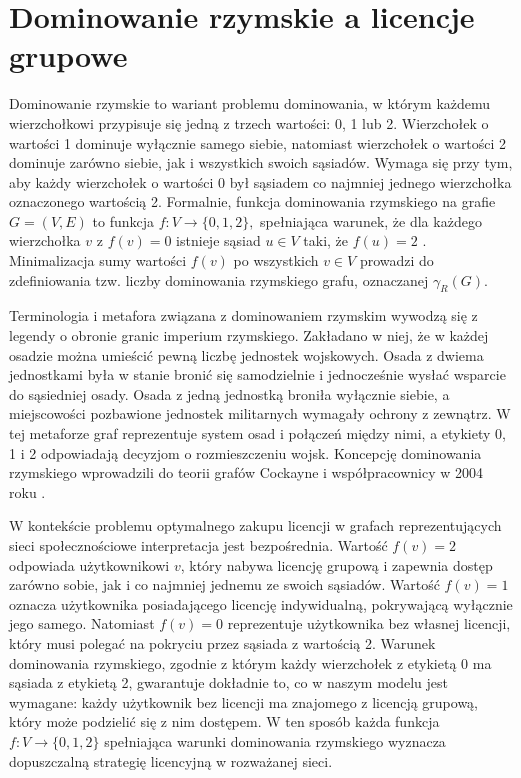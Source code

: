 \section{Dominowanie rzymskie a licencje grupowe}

Dominowanie rzymskie to wariant problemu dominowania, w którym każdemu wierzchołkowi przypisuje się jedną z trzech wartości: 0, 1 lub 2. Wierzchołek o wartości 1 dominuje wyłącznie samego siebie, natomiast wierzchołek o wartości 2 dominuje zarówno siebie, jak i wszystkich swoich sąsiadów. Wymaga się przy tym, aby każdy wierzchołek o wartości 0 był sąsiadem co najmniej jednego wierzchołka oznaczonego wartością 2. Formalnie, funkcja dominowania rzymskiego na grafie $G=(V,E)$ to funkcja $f: V \to \{0,1,2\},$ spełniająca warunek, że dla każdego wierzchołka $v$ z $f(v) = 0$ istnieje sąsiad $u \in V$ taki, że $f(u) = 2$ \cite{Favaron2009}. Minimalizacja sumy wartości $f(v)$ po wszystkich $v \in V$ prowadzi do zdefiniowania tzw. liczby dominowania rzymskiego grafu, oznaczanej $\gamma_R(G)$.

Terminologia i metafora związana z dominowaniem rzymskim wywodzą się z legendy o obronie granic imperium rzymskiego. Zakładano w niej, że w każdej osadzie można umieścić pewną liczbę jednostek wojskowych. Osada z dwiema jednostkami była w stanie bronić się samodzielnie i jednocześnie wysłać wsparcie do sąsiedniej osady. Osada z jedną jednostką broniła wyłącznie siebie, a miejscowości pozbawione jednostek militarnych wymagały ochrony z zewnątrz. W tej metaforze graf reprezentuje system osad i połączeń między nimi, a etykiety 0, 1 i 2 odpowiadają decyzjom o rozmieszczeniu wojsk. Koncepcję dominowania rzymskiego wprowadzili do teorii grafów Cockayne i współpracownicy w 2004 roku \cite{Cockayne2004}.


W kontekście problemu optymalnego zakupu licencji w grafach reprezentujących sieci społecznościowe interpretacja jest bezpośrednia. Wartość $f(v)=2$ odpowiada użytkownikowi $v$, który nabywa licencję grupową i zapewnia dostęp zarówno sobie, jak i co najmniej jednemu ze swoich sąsiadów. Wartość $f(v)=1$ oznacza użytkownika posiadającego licencję indywidualną, pokrywającą wyłącznie jego samego. Natomiast $f(v)=0$ reprezentuje użytkownika bez własnej licencji, który musi polegać na pokryciu przez sąsiada z wartością 2. Warunek dominowania rzymskiego, zgodnie z którym każdy wierzchołek z etykietą 0 ma sąsiada z etykietą 2, gwarantuje dokładnie to, co w naszym modelu jest wymagane: każdy użytkownik bez licencji ma znajomego z licencją grupową, który może podzielić się z nim dostępem. W ten sposób każda funkcja $f:V \to \{0,1,2\}$ spełniająca warunki dominowania rzymskiego wyznacza dopuszczalną strategię licencyjną w rozważanej sieci.


